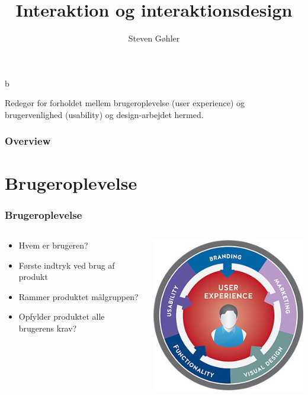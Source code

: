 b\documentclass{beamer}
\title{Interaktion og interaktionsdesign}
\author{Steven Gøhler}
\begin{document}
\begin{frame}
\titlepage
Redegør for forholdet mellem brugeroplevelse (user experience) og brugervenlighed (usability) og design-arbejdet hermed.

\end{frame}

\begin{frame}
\frametitle{Overview}
\tableofcontents
\end{frame}

\section{Brugeroplevelse}
\begin{frame}
  \frametitle{Brugeroplevelse}
  \begin{columns}[T]
    \begin{column}{.6\textwidth}
	  \begin{itemize}
		\item Hvem er brugeren? 
		\item Første indtryk ved brug af produkt
		\item Rammer produktet målgruppen?
		\item Opfylder produktet alle brugerens krav?
	  \end{itemize}
    \end{column}
    \begin{column}{.4\textwidth}
      \includegraphics[width=\textwidth]{ux.jpg}
    \end{column}
  \end{columns}
\end{frame}
\end{document}
